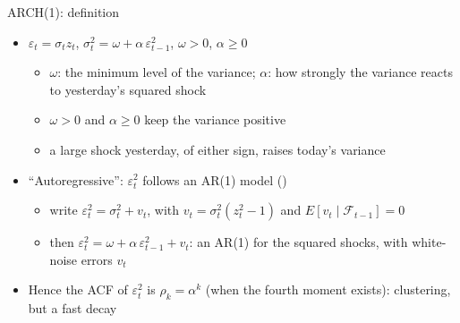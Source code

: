 \begin{frame}{ARCH(1): definition}
\itemsize{\small}
\begin{itemize}
    \item $\varepsilon_t = \sigma_t z_t$, \quad $\sigma_t^2 = \omega + \alpha\,\varepsilon_{t-1}^2$, \quad $\omega > 0$, $\alpha \ge 0$
    \begin{itemize}
        \item $\omega$: the minimum level of the variance; $\alpha$: how strongly the variance reacts to yesterday's squared shock
        \item $\omega > 0$ and $\alpha \ge 0$ keep the variance positive
        \item a large shock yesterday, of either sign, raises today's variance
    \end{itemize}
    \item ``Autoregressive'': $\varepsilon_t^2$ follows an AR(1) model ()
    \begin{itemize}
        \item write $\varepsilon_t^2 = \sigma_t^2 + v_t$, with $v_t = \sigma_t^2(z_t^2 - 1)$ and $E[v_t \mid \mathcal{F}_{t-1}] = 0$
        \item then $\varepsilon_t^2 = \omega + \alpha\,\varepsilon_{t-1}^2 + v_t$: an AR(1) for the squared shocks, with white-noise errors $v_t$
    \end{itemize}
    \item Hence the ACF of $\varepsilon_t^2$ is $\rho_k = \alpha^k$ (when the fourth moment exists): clustering, but a fast decay
\end{itemize}
\end{frame}


